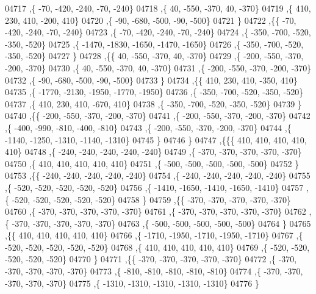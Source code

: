 \begin{DoxyCode}
04717     ,\{   -70,  -420,  -240,   -70,  -240\}
04718     ,\{    40,  -550,  -370,    40,  -370\}
04719     ,\{   410,   230,   410,  -200,   410\}
04720     ,\{   -90,  -680,  -500,   -90,  -500\}
04721     \}
04722    ,\{\{   -70,  -420,  -240,   -70,  -240\}
04723     ,\{   -70,  -420,  -240,   -70,  -240\}
04724     ,\{  -350,  -700,  -520,  -350,  -520\}
04725     ,\{ -1470, -1830, -1650, -1470, -1650\}
04726     ,\{  -350,  -700,  -520,  -350,  -520\}
04727     \}
04728    ,\{\{    40,  -550,  -370,    40,  -370\}
04729     ,\{  -200,  -550,  -370,  -200,  -370\}
04730     ,\{    40,  -550,  -370,    40,  -370\}
04731     ,\{  -200,  -550,  -370,  -200,  -370\}
04732     ,\{   -90,  -680,  -500,   -90,  -500\}
04733     \}
04734    ,\{\{   410,   230,   410,  -350,   410\}
04735     ,\{ -1770, -2130, -1950, -1770, -1950\}
04736     ,\{  -350,  -700,  -520,  -350,  -520\}
04737     ,\{   410,   230,   410,  -670,   410\}
04738     ,\{  -350,  -700,  -520,  -350,  -520\}
04739     \}
04740    ,\{\{  -200,  -550,  -370,  -200,  -370\}
04741     ,\{  -200,  -550,  -370,  -200,  -370\}
04742     ,\{  -400,  -990,  -810,  -400,  -810\}
04743     ,\{  -200,  -550,  -370,  -200,  -370\}
04744     ,\{ -1140, -1250, -1310, -1140, -1310\}
04745     \}
04746    \}
04747   ,\{\{\{   410,   410,   410,   410,   410\}
04748     ,\{  -240,  -240,  -240,  -240,  -240\}
04749     ,\{  -370,  -370,  -370,  -370,  -370\}
04750     ,\{   410,   410,   410,   410,   410\}
04751     ,\{  -500,  -500,  -500,  -500,  -500\}
04752     \}
04753    ,\{\{  -240,  -240,  -240,  -240,  -240\}
04754     ,\{  -240,  -240,  -240,  -240,  -240\}
04755     ,\{  -520,  -520,  -520,  -520,  -520\}
04756     ,\{ -1410, -1650, -1410, -1650, -1410\}
04757     ,\{  -520,  -520,  -520,  -520,  -520\}
04758     \}
04759    ,\{\{  -370,  -370,  -370,  -370,  -370\}
04760     ,\{  -370,  -370,  -370,  -370,  -370\}
04761     ,\{  -370,  -370,  -370,  -370,  -370\}
04762     ,\{  -370,  -370,  -370,  -370,  -370\}
04763     ,\{  -500,  -500,  -500,  -500,  -500\}
04764     \}
04765    ,\{\{   410,   410,   410,   410,   410\}
04766     ,\{ -1710, -1950, -1710, -1950, -1710\}
04767     ,\{  -520,  -520,  -520,  -520,  -520\}
04768     ,\{   410,   410,   410,   410,   410\}
04769     ,\{  -520,  -520,  -520,  -520,  -520\}
04770     \}
04771    ,\{\{  -370,  -370,  -370,  -370,  -370\}
04772     ,\{  -370,  -370,  -370,  -370,  -370\}
04773     ,\{  -810,  -810,  -810,  -810,  -810\}
04774     ,\{  -370,  -370,  -370,  -370,  -370\}
04775     ,\{ -1310, -1310, -1310, -1310, -1310\}
04776     \}

\end{DoxyCode}
